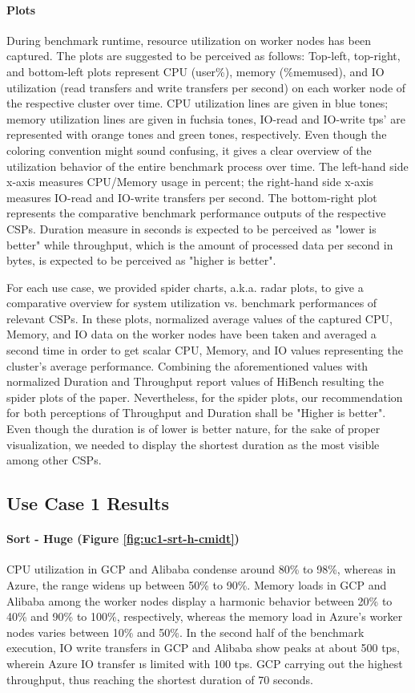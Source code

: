 \documentclass[review]{elsarticle}
\begin{document}
\paragraph{Plots}During benchmark runtime, resource utilization on worker nodes has been captured. The plots are suggested to be perceived as follows: Top-left, top-right, and bottom-left plots represent CPU (user\%), memory (\%memused), and IO utilization (read transfers and write transfers per second) on each worker node of the respective cluster over time. CPU utilization lines are given in blue tones; memory utilization lines are given in fuchsia tones, IO-read and IO-write tps' are represented with orange tones and green tones, respectively. Even though the coloring convention might sound confusing, it gives a clear overview of the utilization behavior of the entire benchmark process over time. The left-hand side x-axis measures CPU/Memory usage in percent; the right-hand side x-axis measures IO-read and IO-write transfers per second. The bottom-right plot represents the comparative benchmark performance outputs of the respective CSPs. Duration measure in seconds is expected to be perceived as "lower is better" while throughput, which is the amount of processed data per second in bytes, is expected to be perceived as "higher is better".

For each use case, we provided spider charts, a.k.a. radar plots, to give a comparative overview for system utilization vs. benchmark performances of relevant CSPs. In these plots, normalized average values of the captured CPU, Memory, and IO data on the worker nodes have been taken and averaged a second time in order to get scalar CPU, Memory, and IO values representing the cluster's average performance. Combining the aforementioned values with normalized Duration and Throughput report values of HiBench resulting the spider plots of the paper. Nevertheless, for the spider plots, our recommendation for both perceptions of Throughput and Duration shall be "Higher is better". Even though the duration is of lower is better nature, for the sake of proper visualization, we needed to display the shortest duration as the most visible among other CSPs.


\subsection{Use Case 1 Results}

\paragraph{Sort - Huge (Figure \ref{fig:uc1-srt-h-cmidt})}CPU utilization in GCP and Alibaba condense around 80\% to 98\%, whereas in Azure, the range widens up between 50\% to 90\%. Memory loads in GCP and Alibaba among the worker nodes display a harmonic behavior between 20\% to 40\% and 90\% to 100\%, respectively, whereas the memory load in Azure's worker nodes varies between 10\% and 50\%. In the second half of the benchmark execution, IO write transfers in GCP and Alibaba show peaks at about 500 tps, wherein Azure IO transfer ıs limited with 100 tps. GCP carrying out the highest throughput, thus reaching the shortest duration of 70 seconds.
\end{document}
